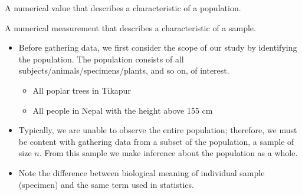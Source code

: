 \documentclass[
  ignorenonframetext,
  aspectratio=169]{beamer}
\providecommand{\tightlist}{%
  \setlength{\itemsep}{0pt}\setlength{\parskip}{0pt}}
\begin{document}
\begin{frame}{}
\protect\hypertarget{section-5}{}
\begin{description}
\small
\item[Parameter] A numerical value that describes a characteristic of a population.
\item[Statistic] A numerical measurement that describes a characteristic of a sample.
\end{description}

\footnotesize

\begin{itemize}
\tightlist
\item
  Before gathering data, we first consider the scope of our study by
  identifying the population. The population consists of all
  subjects/animals/specimens/plants, and so on, of interest.

  \begin{itemize}
  \footnotesize
  \item All poplar trees in Tikapur
  \item All people in Nepal with the height above 155 cm
  \end{itemize}
\item
  Typically, we are unable to observe the entire population; therefore,
  we must be content with gathering data from a subset of the
  population, a sample of size \(n\). From this sample we make inference
  about the population as a whole.
\item
  Note the difference between biological meaning of individual sample
  (specimen) and the same term used in statistics.
\end{itemize}
\end{frame}
\end{document}
